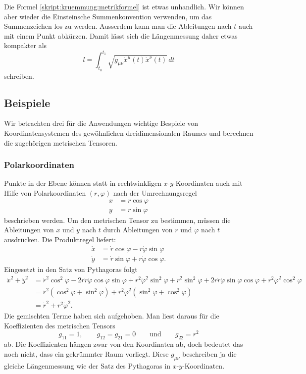 Die Formel \eqref{skript:kruemmung:metrikformel} ist etwas unhandlich.
Wir können aber wieder die Einsteinsche Summenkonvention verwenden,
um das Summenzeichen los zu werden.
Ausserdem kann man die Ableitungen nach $t$ auch mit einem Punkt abkürzen.
Damit lässt sich die Längenmessung daher etwas kompakter als
\[
l=\int_{t_0}^{t_1} \sqrt{g_{\mu\nu}\dot x^{\mu}(t) \dot x^{\nu}(t)}\,dt
\]
schreiben.

\subsection{Beispiele}
Wir betrachten drei für die Anwendungen wichtige Bespiele von
Koordinatensystemen des gewöhnlichen dreidimensionalen Raumes
und berechnen die zugehörigen metrischen Tensoren.

\subsubsection{Polarkoordinaten}
Punkte in der Ebene können statt in rechtwinkligen $x$-$y$-Koordinaten
auch mit Hilfe von Polarkoordinaten $(r,\varphi)$ nach der Umrechnungsregel
\begin{align*}
x&=r\cos\varphi\\
y&=r\sin\varphi
\end{align*}
beschrieben werden.
Um den metrischen Tensor zu bestimmen, müssen die Ableitungen von $x$ 
und $y$ nach $t$ durch Ableitungen von $r$ und $\varphi$ nach $t$ 
ausdrücken.
Die Produktregel liefert:
\begin{align*}
\dot x&= \dot r\cos \varphi - r\dot\varphi \sin\varphi 
\\
\dot y&= \dot r\sin\varphi + r\dot\varphi\cos\varphi.
\end{align*}
Eingesetzt in den Satz von Pythagoras folgt
\begin{align*}
\dot x^2 + \dot y^2
&=
\dot r^2\cos^2\varphi -2r\dot r\dot\varphi\cos\varphi\sin\varphi +r^2\dot \varphi^2\sin^2\varphi
+
\dot r^2\sin^2\varphi +2r\dot r\dot\varphi\sin\varphi\cos\varphi +r^2\dot\varphi^2\cos^2\varphi
\\
&=
\dot r^2(\cos^2\varphi+\sin^2\varphi)+ r^2\dot\varphi^2(\sin^2\varphi+\cos^2\varphi)
\\
&=\dot r^2 + r^2\dot\varphi^2.
\end{align*}
Die gemischten Terme haben sich aufgehoben.
Man liest daraus für die Koeffizienten des metrischen Tensors
\[
g_{11}=1,\qquad g_{12}=g_{21}=0\qquad\text{und}\qquad g_{22}=r^2
\]
ab.
Die Koeffizienten hängen zwar von den Koordinaten ab, doch bedeutet
das noch nicht, dass ein gekrümmter Raum vorliegt.
Diese $g_{\mu\nu}$ beschreiben ja die gleiche Längenmessung wie der Satz
des Pythagoras in $x$-$y$-Koordinaten.

